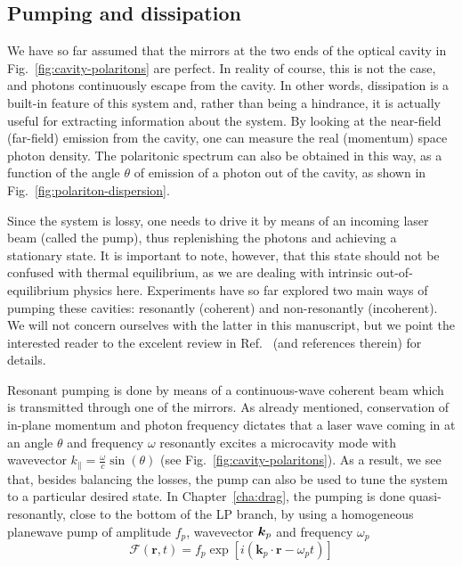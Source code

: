 \subsection{Pumping and dissipation}
\label{subsec:pumping}

We have so far assumed that the mirrors at the two ends of the optical
cavity in Fig.~\ref{fig:cavity-polaritons} are perfect. In reality of
course, this is not the case, and photons continuously escape from the
cavity. In other words, dissipation is a built-in feature of this
system and, rather than being a hindrance, it is actually useful for
extracting information about the system. By looking at the near-field
(far-field) emission from the cavity, one can measure the real
(momentum) space photon density. The polaritonic spectrum can also be
obtained in this way, as a function of the angle $\theta$ of emission
of a photon out of the cavity, as shown in
Fig.~\ref{fig:polariton-dispersion}.

Since the system is lossy, one needs to drive it by means of an
incoming laser beam (called the pump), thus replenishing the photons
and achieving a stationary state. It is important to note, however,
that this state should not be confused with thermal equilibrium, as we
are dealing with intrinsic out-of-equilibrium physics
here. Experiments have so far explored two main ways of pumping these
cavities: resonantly (coherent) and non-resonantly (incoherent). We
will not concern ourselves with the latter in this manuscript, but we
point the interested reader to the excelent review in
Ref.~\cite{Carusotto_2013} (and references therein) for details.

Resonant pumping is done by means of a continuous-wave coherent beam
which is transmitted through one of the mirrors. As already mentioned,
conservation of in-plane momentum and photon frequency dictates that a
laser wave coming in at an angle $\theta$ and frequency $\omega$
resonantly excites a microcavity mode with wavevector
$k_{\parallel} = \frac{\omega}{c}\sin(\theta)$ (see
Fig.~\ref{fig:cavity-polaritons}). As a result, we see that, besides
balancing the losses, the pump can also be used to tune the system to
a particular desired state. In Chapter~\ref{cha:drag}, the pumping is
done quasi-resonantly, close to the bottom of the LP branch, by using
a homogeneous planewave pump of amplitude $f_p$, wavevector $\bm{k}_p$
and frequency $\omega_p$
\begin{equation}\label{eq:pwpump}
  \mathcal{F}(\bm{r},t) = f_p \exp{\left[i (\bm{k}_p \cdot \bm{r} -
    \omega_p t)\right]}
\end{equation}

